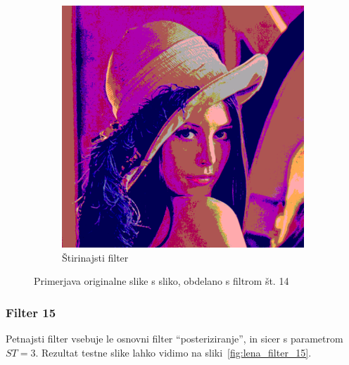 \documentclass[a4paper, 12pt]{book}
\begin{document}
\begin{figure}[!ht]
\begin{subfigure}[b]{0.4\textwidth}
        \includegraphics[width=\textwidth]{lena_filter_14}
        \caption{Štirinajsti filter}
    \end{subfigure}
    \caption{Primerjava originalne slike s sliko, obdelano s filtrom št. 14}
    \label{fig:lena_filter_14}
\end{figure}


\subsubsection*{Filter 15}
Petnajsti filter vsebuje le osnovni filter ``posteriziranje'', in sicer s parametrom
$ST = 3$. Rezultat testne slike lahko vidimo na sliki~\ref{fig:lena_filter_15}.
\end{document}
